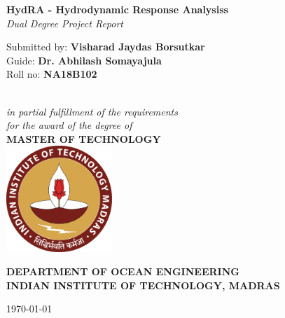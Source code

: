 \begin{titlepage}
\centering

{\huge \bfseries HydRA - Hydrodynamic Response Analysiss} %
\\ [1.5cm]


\emph{\large Dual Degree Project Report } %
\\[1cm] 

\begin{minipage}{1\textwidth}
\begin{center} \large
Submitted by: \textbf{Visharad Jaydas Borsutkar} %
\\
Guide: \textbf{Dr. Abhilash Somayajula} \\
Roll no: \textbf{NA18B102} %
\end{center}
\end{minipage} 
\\[2cm]

\emph{\large in partial fulfillment of the requirements \\ for the award of the degree of }
\\ [2cm]


{\large \bf MASTER OF TECHNOLOGY}
\\[2cm]


\includegraphics[width=4cm]{photos/logo.pdf}


\vspace{0.5cm}
\begin{minipage}{1\textwidth}
\begin{center} \large
\textbf {DEPARTMENT OF OCEAN ENGINEERING \\
INDIAN INSTITUTE OF TECHNOLOGY, MADRAS} %
\\[0.3cm]

\end{center}
\end{minipage} 

\vspace{1cm}
{\large \today}
\end{titlepage}